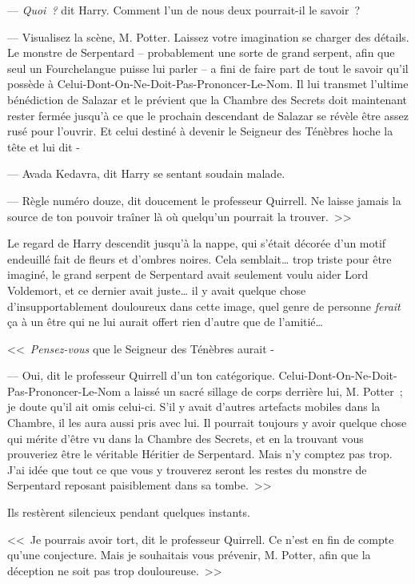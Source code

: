 --- \emph{Quoi~?} dit Harry. Comment l'un de nous deux pourrait-il le savoir~?

--- Visualisez la scène, M. Potter. Laissez votre imagination se charger des détails. Le monstre de Serpentard -- probablement une sorte de grand serpent, afin que seul un Fourchelangue puisse lui parler -- a fini de faire part de tout le savoir qu'il possède à Celui-Dont-On-Ne-Doit-Pas-Prononcer-Le-Nom. Il lui transmet l'ultime bénédiction de Salazar et le prévient que la Chambre des Secrets doit maintenant rester fermée jusqu'à ce que le prochain descendant de Salazar se révèle être assez rusé pour l'ouvrir. Et celui destiné à devenir le Seigneur des Ténèbres hoche la tête et lui dit -

--- Avada Kedavra, dit Harry se sentant soudain malade.

--- Règle numéro douze, dit doucement le professeur Quirrell. Ne laisse jamais la source de ton pouvoir traîner là où quelqu'un pourrait la trouver.~>>

Le regard de Harry descendit jusqu'à la nappe, qui s'était décorée d'un motif endeuillé fait de fleurs et d'ombres noires. Cela semblait… trop triste pour être imaginé, le grand serpent de Serpentard avait seulement voulu aider Lord Voldemort, et ce dernier avait juste… il y avait quelque chose d'insupportablement douloureux dans cette image, quel genre de personne \emph{ferait} ça à un être qui ne lui aurait offert rien d'autre que de l'amitié…

<<~\emph{Pensez-vous} que le Seigneur des Ténèbres aurait -

--- Oui, dit le professeur Quirrell d'un ton catégorique. Celui-Dont-On-Ne-Doit-Pas-Prononcer-Le-Nom a laissé un sacré sillage de corps derrière lui, M. Potter~; je doute qu'il ait omis celui-ci. S'il y avait d'autres artefacts mobiles dans la Chambre, il les aura aussi pris avec lui. Il pourrait toujours y avoir quelque chose qui mérite d'être vu dans la Chambre des Secrets, et en la trouvant vous prouveriez être le véritable Héritier de Serpentard. Mais n'y comptez pas trop. J'ai idée que tout ce que vous y trouverez seront les restes du monstre de Serpentard reposant paisiblement dans sa tombe.~>>

Ils restèrent silencieux pendant quelques instants.

<<~Je pourrais avoir tort, dit le professeur Quirrell. Ce n'est en fin de compte qu'une conjecture. Mais je souhaitais vous prévenir, M. Potter, afin que la déception ne soit pas trop douloureuse.~>>

